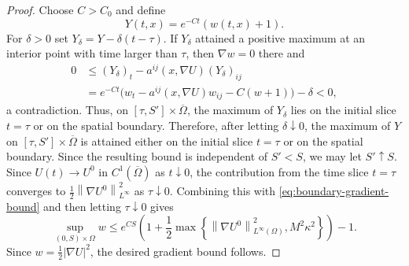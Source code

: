 \documentclass[10pt,a4paper]{amsart}
\newcommand{\norm}[1]{\left\lVert #1\right\rVert}
\begin{document}
\begin{proof}
Choose $C>C_0$ and define
\[
        Y(t,x)=e^{-Ct}(w(t,x)+1).
\]
For $\delta>0$ set $Y_\delta=Y-\delta(t-\tau)$.  If $Y_\delta$ attained a positive maximum at an interior point with time larger than $\tau$, then $\nabla w=0$ there and
\[
\begin{aligned}
        0&\le (Y_\delta)_t-a^{ij}(x,\nabla U)(Y_\delta)_{ij}\\
        &=e^{-Ct}\bigl(w_t-a^{ij}(x,\nabla U)w_{ij}-C(w+1)\bigr)-\delta<0,
\end{aligned}
\]
a contradiction.  Thus, on $[\tau,S']\times\overline\Omega$, the maximum of $Y_\delta$
lies on the initial slice $t=\tau$ or on the spatial boundary.  Therefore, after letting $\delta\downarrow0$, the maximum of $Y$ on
$[\tau,S']\times\overline{\Omega}$ is attained either on the initial
slice $t=\tau$ or on the spatial boundary.
Since the resulting bound is independent of $S'<S$, we may let $S'\uparrow S$.  Since $U(t)\to U^0$ in $C^1(\overline\Omega)$ as $t\downarrow0$, the contribution from the time slice $t=\tau$ converges to $\frac12\norm{\nabla U^0}_{L^\infty}^2$ as $\tau\downarrow0$.  Combining this with \eqref{eq:boundary-gradient-bound} and then letting $\tau\downarrow0$ gives
\[
        \sup_{(0,S)\times\Omega}w
        \le
        e^{CS}\left(1+\frac12\max\left\{
        \norm{\nabla U^0}_{L^\infty(\Omega)}^2,
        M^2\kappa^2
        \right\}\right)-1.
\]
Since \(w=\frac12|\nabla U|^2\), the desired gradient bound follows.
\end{proof}
\end{document}
